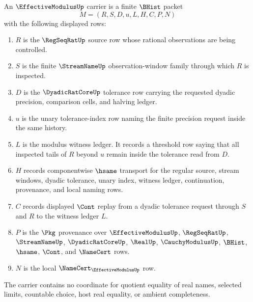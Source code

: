 \begin{definition}
\label{def:effective-modulus-carrier}
An $\EffectiveModulusUp$ carrier is a finite $\BHist$ packet
$$
M=(R,S,D,u,L,H,C,P,N)
$$
with the following displayed rows:
\begin{enumerate}
\item $R$ is the $\RegSeqRatUp$ source row whose rational observations are being controlled.
\item $S$ is the finite $\StreamNameUp$ observation-window family through which $R$ is inspected.
\item $D$ is the $\DyadicRatCoreUp$ tolerance row carrying the requested dyadic precision, comparison cells, and halving ledger.
\item $u$ is the unary tolerance-index row naming the finite precision request inside the same history.
\item $L$ is the modulus witness ledger. It records a threshold row saying that all inspected tails of $R$ beyond $u$ remain inside the tolerance read from $D$.
\item $H$ records componentwise $\hsame$ transport for the regular source, stream windows, dyadic tolerance, unary index, witness ledger, continuation, provenance, and local naming rows.
\item $C$ records displayed $\Cont$ replay from a dyadic tolerance request through $S$ and $R$ to the witness ledger $L$.
\item $P$ is the $\Pkg$ provenance over $\EffectiveModulusUp$, $\RegSeqRatUp$, $\StreamNameUp$, $\DyadicRatCoreUp$, $\RealUp$, $\CauchyModulusUp$, $\BHist$, $\hsame$, $\Cont$, and $\NameCert$ rows.
\item $N$ is the local $\NameCert_{\EffectiveModulusUp}$ row.
\end{enumerate}
The carrier contains no coordinate for quotient equality of real names, selected limits, countable choice, host real equality, or ambient completeness.
\end{definition}

